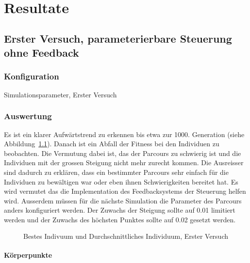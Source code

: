 %
%


\chapter{Resultate\label{chap:Resulate}}

\section{Erster Versuch, parameterierbare Steuerung ohne Feedback}

  \subsection{Konfiguration}

    \begin{table}[H]
      
      \caption{Simulationsparameter, Erster Versuch}
    \end{table}

  \subsection{Auswertung}

    Es ist ein klarer Aufwärtstrend zu erkennen bis etwa zur 1000. Generation (siehe Abbildung~\ref{fig:graphFirst}).
    Danach ist ein Abfall der Fitness bei den Individuen zu beobachten.
    Die Vermutung dabei ist, das der Parcours zu schwierig ist und die Individuen
    mit der grossen Steigung nicht mehr zurecht kommen.
    Die Ausreisser sind dadurch zu erklären,
    dass ein bestimmter Parcours sehr einfach für die Individuen zu bewältigen war oder eben ihnen Schwierigkeiten bereitet hat.
    Es wird vermutet das die Implementation des Feedbacksystems der Steuerung helfen wird.
    Ausserdem müssen für die nächste Simulation die Parameter des Parcours anders konfiguriert werden.
    Der Zuwachs der Steigung sollte auf 0.01 limitiert werden und der Zuwachs des höchsten Punktes
    sollte auf 0.02 gesetzt werden.

      \begin{figure}
        
        \caption{Bestes Indivuum und Durchschnittliches Individuum, Erster Versuch\label{fig:graphFirst}}
      \end{figure}

    \subsubsection{Körperpunkte\label{subsub:bp}}

